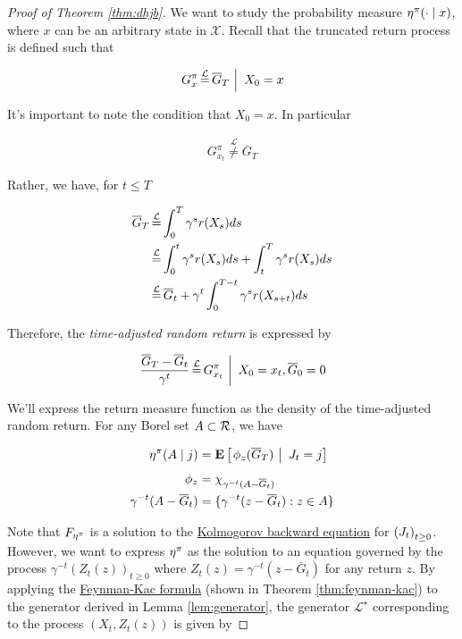 \begin{proof}[Proof of Theorem \ref{thm:dhjb}]
  We want to study the probability measure
  $\returnmeasure^\pi(\cdot\mid x)$, where $x$ can be an
  arbitrary state in $\mathcal{X}$.
  Recall that the truncated return process is defined such that

  \begin{align*}
    \Conditional{G_x^\pi \eqlaw \overline{G}_T}{X_0 = x}
  \end{align*}

  It's important to note the condition that $X_0 = x$. In particular

  \begin{align*}
    G_{x_t}^\pi\overset{\mathcal{L}}{\neq} \overline{G}_T
  \end{align*}

  Rather, we have, for $t\leq T$

  \begin{align*}
    \overline{G}_T &\eqlaw \int_0^T\gamma^sr(X_s)ds\\
    &\eqlaw \int_0^{t}\gamma^sr(X_s)ds +
      \int_{t}^T\gamma^sr(X_s)ds\\
    &\eqlaw \overline{G}_t + \gamma^t\int_0^{T-t}\gamma^sr(X_{s+t})ds\\
  \end{align*}
  
  Therefore, the \emph{time-adjusted random return} is expressed by

  \begin{align*}
    \Conditional{\frac{\overline{G}_T - \overline{G}_t}{\gamma^t}
                   \eqlaw G_{x_t}^\pi}{X_0 = x_t, \overline{G}_0 = 0}\\
  \end{align*}

  We'll express the return measure function as the density of the
  time-adjusted random return. For any Borel set
  $A\subset\returnspace$, we have

  \begin{align*}
    \returnmeasure^\pi(A\mid j) &= \ConditionExpect{\phi_z(\overline{G}_T)}{J_t=j}\\
    \phi_z &= \characteristic{\gamma^{-t}(A - \overline{G}_t)}\\
    \gamma^{-t}(A - \overline{G}_t) &= \{\gamma^{-t}(z -
                                      \overline{G}_t) : z\in A\}
  \end{align*}

  Note that $\cdf$ is a solution to
  the \hyperref[thm:kbe]{Kolmogorov backward equation} for
  $\indexedabove{t}{J}$.
  However, we want to express $\returnmeasure^\pi$ as the solution to
  an equation governed by the process
  $\gamma^{-t}(Z_t(z))_{t\geq 0}$ where $Z_t(z) = \gamma^{-t}(z -
  \overline{G}_t)$ for any return $z$. By applying the
  \hyperref[app:feynman-kac]{Feynman-Kac formula} (shown in
  Theorem \ref{thm:feynman-kac}) to the generator derived in
  Lemma \ref{lem:generator}, the generator
  $\mathscr{L}^\star$ corresponding to the process $(X_t, Z_t(z))$
  is given by


\end{proof}
